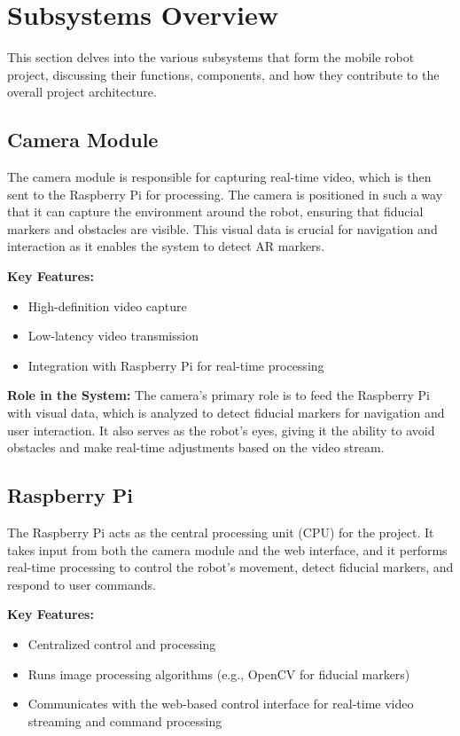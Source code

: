\section{\label{sec:subsystems} Subsystems Overview}
This section delves into the various subsystems that form the mobile robot project, discussing their functions, components, and how they contribute to the overall project architecture.

\subsection{\label{subsec:camera} Camera Module}
The camera module is responsible for capturing real-time video, which is then sent to the Raspberry Pi for processing. The camera is positioned in such a way that it can capture the environment around the robot, ensuring that fiducial markers and obstacles are visible. This visual data is crucial for navigation and interaction as it enables the system to detect AR markers.

\textbf{Key Features:}
\begin{itemize}
	\item High-definition video capture
	\item Low-latency video transmission
	\item Integration with Raspberry Pi for real-time processing
\end{itemize}

\textbf{Role in the System:}
The camera's primary role is to feed the Raspberry Pi with visual data, which is analyzed to detect fiducial markers for navigation and user interaction. It also serves as the robot's eyes, giving it the ability to avoid obstacles and make real-time adjustments based on the video stream.

\subsection{\label{subsec:raspberry} Raspberry Pi}
The Raspberry Pi acts as the central processing unit (CPU) for the project. It takes input from both the camera module and the web interface, and it performs real-time processing to control the robot's movement, detect fiducial markers, and respond to user commands.

\textbf{Key Features:}
\begin{itemize}
	\item Centralized control and processing
	\item Runs image processing algorithms (e.g., OpenCV for fiducial markers)
	\item Communicates with the web-based control interface for real-time video streaming and command processing
\end{itemize}

